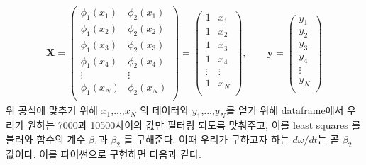 \documentclass[11pt]{article}
\begin{document}
\begin{equation}
\begin{split}
\mathbf X
=
\left(
\begin{matrix}
\phi_1(x_1) & \phi_2(x_1) \\
\phi_1(x_2) & \phi_2(x_2) \\
\phi_1(x_3) & \phi_2(x_3) \\
\phi_1(x_4) & \phi_2(x_4) \\
\vdots & \vdots \\
\phi_1(x_N) & \phi_2(x_N) \\
\end{matrix}
\right)
=
\left(
\begin{matrix}
1 & x_1 \\
1 & x_2 \\
1 & x_3 \\
1 & x_4 \\
\vdots & \vdots \\
1 & x_N \\
\end{matrix}
\right)
,\qquad
\mathbf y
=
\left(
\begin{matrix}
y_1 \\
y_2 \\
y_3 \\
y_4 \\
\vdots \\
y_N \\
\end{matrix}
\right)
\end{split}
\end{equation}
위 공식에 맞추기 위해 $x_1$,...,$x_N$ 의 데이터와 $y_1$,...,$y_N$를 얻기 위해 dataframe에서 우리가 원하는 7000과 10500사이의 값만 필터링 되도록 맞춰주고, 이를 least squares 를 불러와 함수의 계수 $\beta_1$과 $\beta_2$ 를 구해준다. 이때 우리가 구하고자 하는 $d\omega/dt$는 곧 $\beta_2$ 값이다. 이를 파이썬으로 구현하면 다음과 같다.
\end{document}
